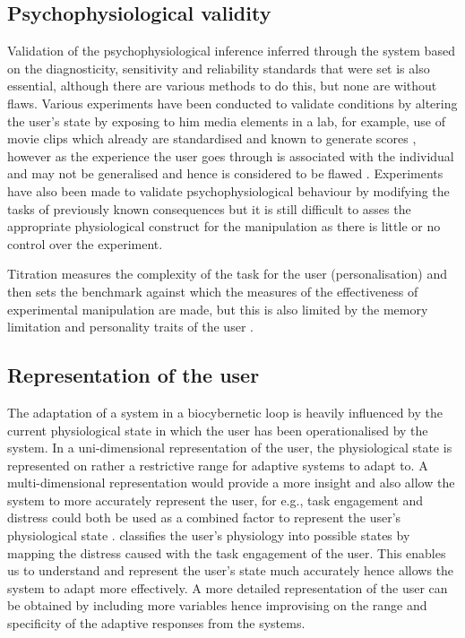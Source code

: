 \documentclass[10pt,a4paper]{article}
\begin{document}
\subsection{Psychophysiological validity}
Validation of the psychophysiological inference inferred through the system based on the diagnosticity, sensitivity and reliability standards that were set is also essential, although there are various methods to do this, but none are without flaws. Various experiments have been conducted to validate conditions by altering the user's state by exposing to him media elements in a lab, for example, use of movie clips which already are standardised and known to generate scores \cite{LNZ:2004:EURASIP}, however as the experience the user goes through is associated with the individual and may not be generalised and hence is considered to be flawed \cite{FCLD:2009:FPC}. Experiments have also been made to validate psychophysiological behaviour by modifying the tasks of previously known consequences but it is still difficult to asses the appropriate physiological construct for the manipulation as there is little or no control over the experiment.

Titration \cite{WGFR:1999:HF} measures the complexity of the task for the user (personalisation) and then sets the benchmark against which the measures of the effectiveness of experimental manipulation are made, but this is also limited by the memory limitation and personality traits of the user \cite{NW:1977:PSYCRI,VL:2006:IEEE}.

\subsection{Representation of the user}
\label{ROU}
The adaptation of a system in a biocybernetic loop is heavily influenced by the current physiological state in which the user has been operationalised by the system. In a uni-dimensional representation of the user, the physiological state is represented on rather a restrictive range for adaptive systems to adapt to. A multi-dimensional representation would provide a more insight and also allow the system to more accurately represent the user, for e.g., task engagement and distress could both be used as a combined factor to represent the user's physiological state \cite{FCV:2006:BP,FC:2007:ACEW}. \cite{FCLD:2009:FPC} classifies the user's physiology into possible states by mapping the distress caused with the task engagement of the user. This enables us to understand and represent the user's state much accurately hence allows the system to adapt more effectively. A more detailed representation of the user can be obtained by including more variables \cite{KPB:2007:IJHCS} hence improvising on the range and specificity of the adaptive responses from the systems.
\end{document}
